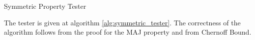 \begin{algorithm}[t]\label{alg:symmetric_tester}

\caption{Symmetric Property Tester}
\end{algorithm}

The tester is given at algorithm \ref{alg:symmetric_tester}.
The correctness of the algorithm follows from the proof for the MAJ property and from Chernoff Bound.